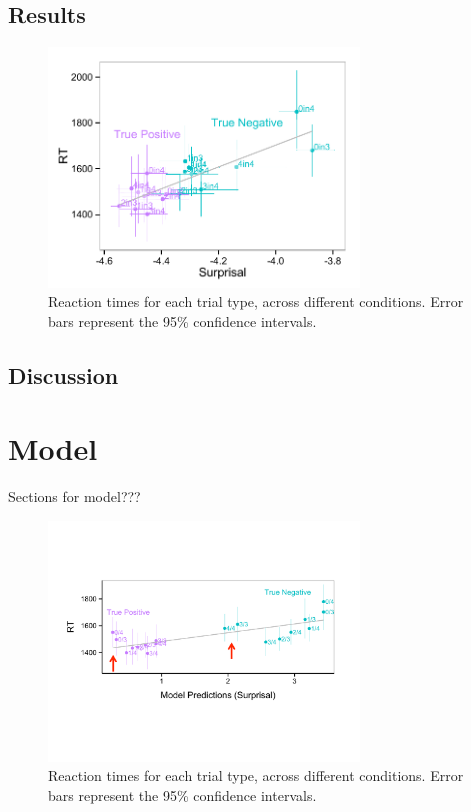 \documentclass[10pt,letterpaper]{article}
\begin{document}
\subsection{Results}
\begin{figure}
\begin{center} 
\includegraphics[width=3.25in]{figures/speakerstudy_comparison.pdf}
\caption{\label{fig:addition_subs} Reaction times for each trial type, across different conditions.  Error bars represent the 95\% confidence intervals.}
\end{center} 
\end{figure}

\subsection{Discussion}

\section{Model}
Sections for model???

\begin{figure}
\begin{center} 
\includegraphics[width=3.25in]{figures/model1_comparison.pdf}
\caption{\label{fig:addition_subs} Reaction times for each trial type, across different conditions.  Error bars represent the 95\% confidence intervals.}
\end{center} 
\end{figure}
\end{document}
